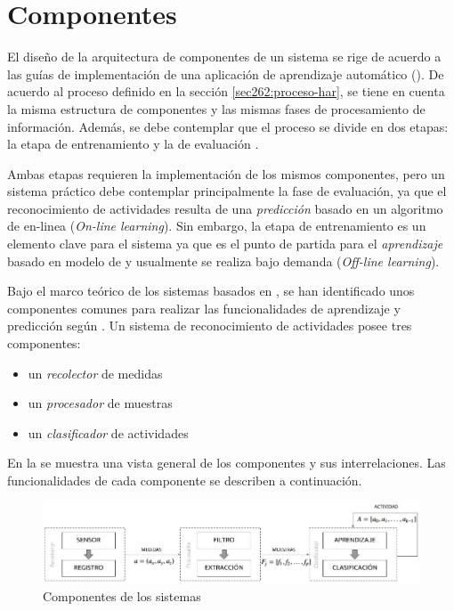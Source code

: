 \section{Componentes}

\label{sec42:componentes}El diseño de la arquitectura de componentes
de un sistema  se rige de acuerdo a las guías de implementación
de una aplicación de aprendizaje automático (). De acuerdo
al proceso definido en la sección \ref{sec262:proceso-har}, se tiene
en cuenta la misma estructura de componentes y las mismas fases de
procesamiento de información. Además, se debe contemplar que el proceso
se divide en dos etapas: la etapa de entrenamiento y la de evaluación
\cite{LaraLabrador2013}. 

Ambas etapas requieren la implementación de los mismos componentes,
pero un sistema  práctico debe contemplar principalmente
la fase de evaluación, ya que el reconocimiento de actividades resulta
de una \emph{predicción} basado en un algoritmo de  en-linea
(\emph{On-line learning}). Sin embargo, la etapa de entrenamiento
es un elemento clave para el sistema ya que es el punto de partida
para el \emph{aprendizaje} basado en modelo de  y usualmente
se realiza bajo demanda (\emph{Off-line learning}).

Bajo el marco teórico de los sistemas  basados en ,
se han identificado unos componentes comunes para realizar las funcionalidades
de aprendizaje y predicción según \cite{Choudhury2008}. Un sistema
de reconocimiento de actividades posee tres componentes:
\begin{itemize}
\item un \emph{recolector }de medidas
\item un\emph{ procesador }de muestras 
\item un \emph{clasificador }de actividades
\end{itemize}
En la  se muestra una vista general
de los componentes y sus interrelaciones. Las funcionalidades de cada
componente se describen a continuación. 

\begin{figure}[!tbph]
\centering{}\includegraphics[width=1\linewidth]{capitulo-4/graphics/diagrama_4_1}\caption[Arquitectura de sistema ]{\label{fig4:componentes-har}Componentes de los sistemas }
\end{figure}


